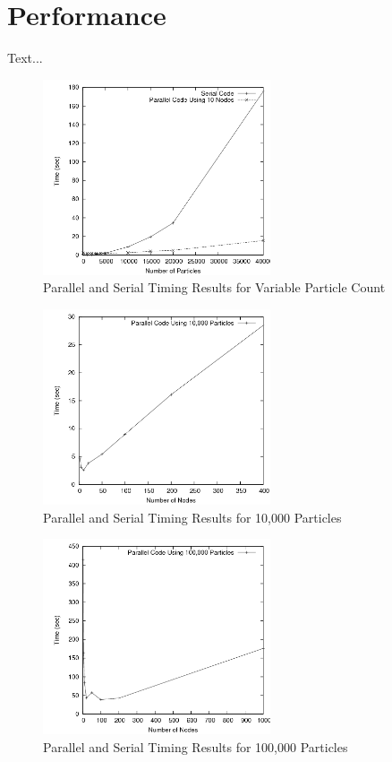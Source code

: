 \documentclass{article}
\begin{document}
\section{Performance}
Text...

\begin{figure}
\centering
\includegraphics[width=0.6\textwidth]{img/timing_data_variable_particles.png}
\caption{Parallel and Serial Timing Results for Variable Particle Count}
\label{chart1}
\end{figure}

\begin{figure}
\centering
\includegraphics[width=0.6\textwidth]{img/timing_data_10000_particles.png}
\caption{Parallel and Serial Timing Results for 10,000 Particles}
\label{chart2}
\end{figure}

\begin{figure}
\centering
\includegraphics[width=0.6\textwidth]{img/timing_data_100000_particles.png}
\caption{Parallel and Serial Timing Results for 100,000 Particles}
\label{chart3}
\end{figure}
\end{document}
